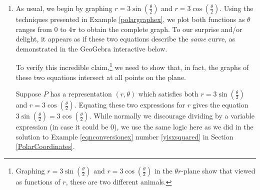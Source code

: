 \documentclass{ximera}
\begin{document}
\begin{example}
\begin{explanation}
\begin{enumerate}
 
 
 Coupling $r = -6\cos(2\theta)$ with  $r=3$ gives $-6\cos(2\theta) = 3$ or $\cos(2\theta) = -\frac{1}{2}$.  Solving, we get $\theta = \frac{\pi}{3} + \pi k$ or $\theta = \frac{2\pi}{3} + \pi k$.   From these solutions, we obtain\footnote{We obtain these representations by substituting the values for $\theta$ into $r = 6\cos(2\theta)$, once again, for illustration purposes. Again, we could `plug' these values for $\theta$ into $r=3$ (where there is no $\theta$) and get the list of points: $\left(3, \frac{\pi}{3}\right)$,  $\left(3, \frac{2\pi}{3}\right)$,  $\left(3, \frac{4\pi}{3}\right)$ and  $\left(3, \frac{5\pi}{3}\right)$.  While it is not true that  $\left(3, \frac{\pi}{3}\right)$ represents the same point as  $\left(-3, \frac{\pi}{3}\right)$, we still get the same \textit{set} of solutions.} the remaining four intersection points with representations $\left(-3, \frac{\pi}{3}\right)$,  $\left(-3, \frac{2\pi}{3}\right)$,  $\left(-3, \frac{4\pi}{3}\right)$ and  $\left(-3, \frac{5\pi}{3}\right)$, which check graphically.

\item  As usual, we begin by graphing  $r = 3\sin\left(\frac{\theta}{2}\right)$ and $r = 3\cos\left(\frac{\theta}{2}\right)$.  Using the techniques presented in Example \ref{polargraphex}, we  plot both functions as $\theta$ ranges from $0$ to $4\pi$ to obtain the complete graph. To our surprise and/or delight, it appears as if these two equations describe the \textit{same} curve, as demonstrated in the GeoGebra interactive below.

\begin{center}
\end{center}

To verify this incredible claim,\footnote{Graphing $r =  3\sin\left(\frac{\theta}{2}\right)$ and $r= 3\cos\left(\frac{\theta}{2}\right)$ in the $\theta r$-plane show that viewed as functions of $r$, these are two different animals.} we need to show that, in fact, the graphs of these two equations intersect at all points on the plane.  

 

Suppose $P$ has a representation $(r,\theta)$ which satisfies both $r = 3\sin\left(\frac{\theta}{2}\right)$ and $r = 3\cos\left(\frac{\theta}{2}\right)$.  Equating these two expressions for $r$ gives the equation $3\sin\left(\frac{\theta}{2}\right) =  3\cos\left(\frac{\theta}{2}\right)$.  While normally we discourage dividing by a variable expression (in case it could be $0$), we use the same logic here as we did in the solution to Example \ref{eqnconversionex} number \ref{yisxsquared} in Section \ref{PolarCoordinates}.  




\end{enumerate}
\end{explanation}
\end{example}
\end{document}
